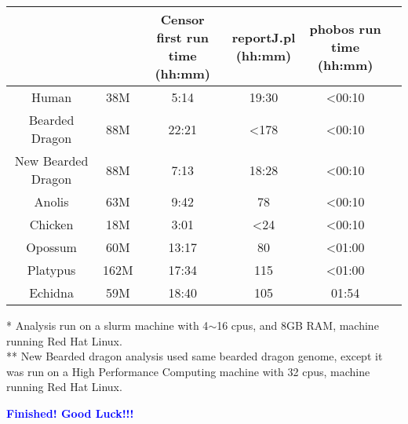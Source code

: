 \documentclass[12pt]{report}
\begin{document}
\footnotesize  %
\setlength\tabcolsep{1.5pt}
\begin{center}
	\begin{tabular}{ | c | c | c | c| c |c|}
		\hline
		\thead{Genome}	& 	\thead{Consensus sequences size}	&	\thead{Censor first run \\ time (hh:mm)}	&	\thead{reportJ.pl \\ (hh:mm)}	&	\thead{phobos run time \\ (hh:mm)} \\
		\hline
		Human	&	38M	&	5:14	&	19:30	&	{<}00:10 \\
		\hline 
		Bearded Dragon	&	88M	&	22:21	&	{<}178	&	{<}00:10 \\
		\hline
		New Bearded Dragon	&	88M	&	7:13	&	18:28	&	{<}00:10\\
		\hline
		Anolis	&	63M	&	9:42	&	78	&	{<}00:10 \\
		\hline
		Chicken	&	18M	&	3:01	&	{<}24	&	{<}00:10 \\
		\hline
		Opossum	&	60M	&	13:17	&	80	&	{<}01:00 \\
		\hline
		Platypus	&	162M	&	17:34	&	115	&	{<}01:00 \\
		\hline
		Echidna	&	59M	&	18:40	&	105	&	01:54 \\
		\hline
	\end{tabular}
\end{center}

* Analysis run on a slurm machine with 4$\sim$16 cpus, and 8GB RAM, machine running Red Hat Linux.\\
** New Bearded dragon analysis used same bearded dragon genome, except it was run on a High Performance Computing machine with 32 cpus, machine running Red Hat Linux.

\textbf{\textcolor{blue}{ \Large Finished! Good Luck!!!}}
\end{document}
